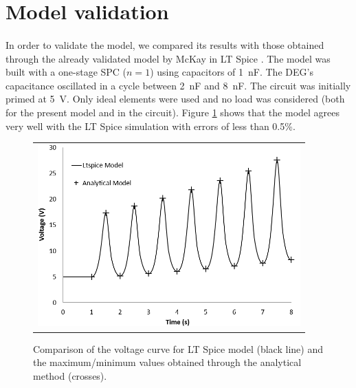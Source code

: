 \section{Model validation}

\paragraph{} In order to validate the model, we compared its results with those obtained through the already validated model by McKay in LT Spice \cite{Thesis}. The model was built with a one-stage SPC ($n=1$) using capacitors of \SI{1}{\nano\farad}. The DEG's capacitance oscillated in a cycle between \SI{2}{\nano\farad} and \SI{8}{\nano\farad}. The circuit was initially primed at \SI{5}{\volt}. Only ideal elements were used and no load was considered (both for the present model and in the circuit). Figure \ref{fig:valid} shows that the model agrees very well with the LT Spice simulation with errors of less than 0.5\%.

\begin{figure}[ht]
\begin{center}
\begin{tabular}{c}
\includegraphics[height=7cm]{fig03/Modelcomparison3.PNG}\\
\end{tabular}
\end{center}
\caption 
{ \label{fig:valid}
Comparison of the voltage curve for LT Spice model (black line) and the maximum/minimum values obtained through the analytical method (crosses).} 
\end{figure}

